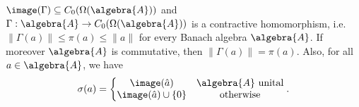 \documentclass[a4paper]{article}
\begin{document}
\begin{theorem}
	$\image(\Gamma) \subseteq C_0(\Omega(\algebra{A}))$ and $\Gamma: \algebra{A} \to C_0(\Omega(\algebra{A}))$ is a contractive homomorphism, i.e. $\|\Gamma(a) \| \leq \pi(a) \leq \|a\|$ for every Banach algebra $\algebra{A}$.
	If moreover $\algebra{A}$ is commutative, then $\|\Gamma(a)\| = \pi(a)$. 
	Also, for all $a \in \algebra{A}$, we have
	\begin{equation*}
		\sigma(a) = \left\{ \begin{matrix}
			\image(\hat a) & \algebra{A} \text{ unital} \\
			\image(\hat a) \cup \{0\} & \text{otherwise}
		\end{matrix}  \right. \text{.}
	\end{equation*}
\end{theorem}
\end{document}
